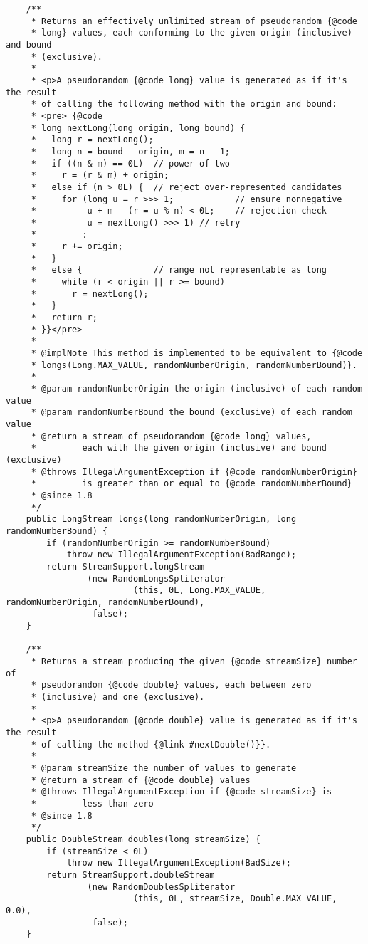 \documentclass[12pt,a4paper,twoside,openright,titlepage,final]{article}
\begin{document}
\begin{verbatim}
    /**
     * Returns an effectively unlimited stream of pseudorandom {@code
     * long} values, each conforming to the given origin (inclusive) and bound
     * (exclusive).
     *
     * <p>A pseudorandom {@code long} value is generated as if it's the result
     * of calling the following method with the origin and bound:
     * <pre> {@code
     * long nextLong(long origin, long bound) {
     *   long r = nextLong();
     *   long n = bound - origin, m = n - 1;
     *   if ((n & m) == 0L)  // power of two
     *     r = (r & m) + origin;
     *   else if (n > 0L) {  // reject over-represented candidates
     *     for (long u = r >>> 1;            // ensure nonnegative
     *          u + m - (r = u % n) < 0L;    // rejection check
     *          u = nextLong() >>> 1) // retry
     *         ;
     *     r += origin;
     *   }
     *   else {              // range not representable as long
     *     while (r < origin || r >= bound)
     *       r = nextLong();
     *   }
     *   return r;
     * }}</pre>
     *
     * @implNote This method is implemented to be equivalent to {@code
     * longs(Long.MAX_VALUE, randomNumberOrigin, randomNumberBound)}.
     *
     * @param randomNumberOrigin the origin (inclusive) of each random value
     * @param randomNumberBound the bound (exclusive) of each random value
     * @return a stream of pseudorandom {@code long} values,
     *         each with the given origin (inclusive) and bound (exclusive)
     * @throws IllegalArgumentException if {@code randomNumberOrigin}
     *         is greater than or equal to {@code randomNumberBound}
     * @since 1.8
     */
    public LongStream longs(long randomNumberOrigin, long randomNumberBound) {
        if (randomNumberOrigin >= randomNumberBound)
            throw new IllegalArgumentException(BadRange);
        return StreamSupport.longStream
                (new RandomLongsSpliterator
                         (this, 0L, Long.MAX_VALUE, randomNumberOrigin, randomNumberBound),
                 false);
    }

    /**
     * Returns a stream producing the given {@code streamSize} number of
     * pseudorandom {@code double} values, each between zero
     * (inclusive) and one (exclusive).
     *
     * <p>A pseudorandom {@code double} value is generated as if it's the result
     * of calling the method {@link #nextDouble()}}.
     *
     * @param streamSize the number of values to generate
     * @return a stream of {@code double} values
     * @throws IllegalArgumentException if {@code streamSize} is
     *         less than zero
     * @since 1.8
     */
    public DoubleStream doubles(long streamSize) {
        if (streamSize < 0L)
            throw new IllegalArgumentException(BadSize);
        return StreamSupport.doubleStream
                (new RandomDoublesSpliterator
                         (this, 0L, streamSize, Double.MAX_VALUE, 0.0),
                 false);
    }


\end{verbatim}
\end{document}
